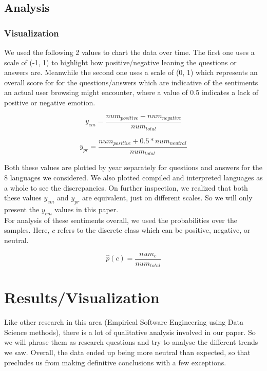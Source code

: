 \documentclass[conference]{IEEEtran}
\begin{document}
\subsection{Analysis}
\subsubsection{Visualization}
We used the following 2 values to chart the data over time. The first one uses a scale of (-1, 1) to highlight how positive/negative leaning the questions or answers are. Meanwhile the second one uses a scale of (0, 1) which represents an overall score for for the questions/answers which are indicative of the sentiments an actual user browsing might encounter, where a value of 0.5 indicates a lack of positive or negative emotion.

\begin{equation}
    y_{em} = \frac{num_{positive} - num_{negative}}{num_{total}}
\end{equation}

\begin{equation}
    y_{pr} = \frac{num_{positive} + 0.5*num_{neutral}}{num_{total}}
\end{equation}

Both these values are plotted by year separately for questions and answers for the 8 languages we considered. We also plotted compiled and interpreted languages as a whole to see the discrepancies. On further inspection, we realized that both these values $y_{em}$ and $y_{pr}$ are equivalent, just on different scales. So we will only present the $y_{em}$ values in this paper. \\

For analysis of these sentiments overall, we used the probabilities over the samples. Here, $c$ refers to the discrete class which can be positive, negative, or neutral.

\begin{equation}
    \hat{p}(c) = \frac{num_c}{num_{total}}
\end{equation}

\section{Results/Visualization}
Like other research in this area (Empirical Software Engineering using Data Science methods), there is a lot of qualitative analysis involved in our paper. So we will phrase them as research questions and try to analyse the different trends we saw. Overall, the data ended up being more neutral than expected, so that precludes us from making definitive conclusions with a few exceptions. \\
\end{document}

